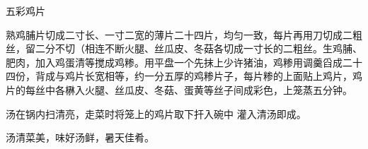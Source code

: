 \begin{recipe}{五彩鸡片}

\ingredients


\cooking

\step 熟鸡脯片切成二寸长、一寸二宽的薄片二十四片，均匀一致，每片再用刀切成二粗丝，留二分不切（相连不断火腿、丝瓜皮、冬菇各切成一寸长的二粗丝。生鸡脯、肥肉，加入鸡蛋清等搅成鸡糁。用平盘一个先抹上少许猪油，鸡糁用调羹舀成二十四份，背成与鸡片长宽相等，约一分五厚的鸡糁片子，每片糁的上面贴上鸡片，鸡片的每丝中各楙入火腿、丝瓜皮、冬菇、蛋黄等丝子间成彩色，上笼蒸五分钟。

汤在锅内扫清亮，走菜时将笼上的鸡片取下扞入碗中 灌入清汤即成。

\notes

汤清菜美，味好汤鲜，暑天佳肴。

\end{recipe}


